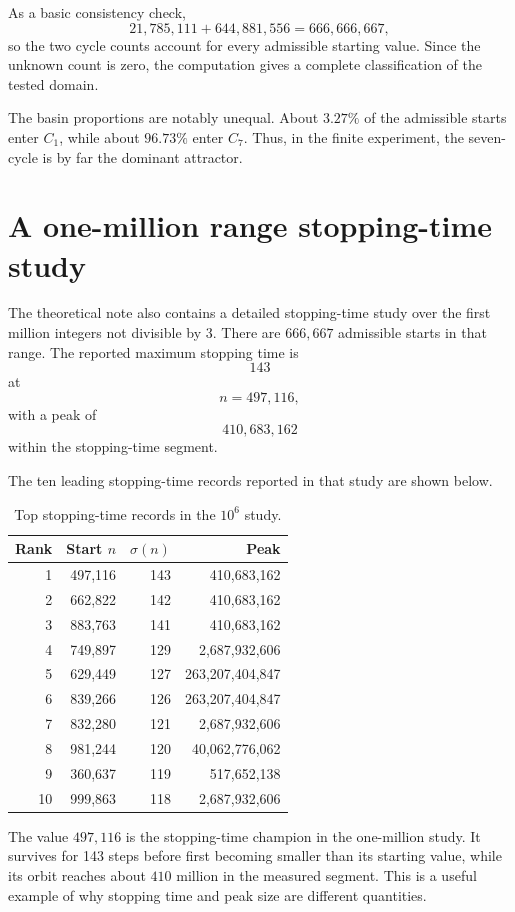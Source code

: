 \documentclass[11pt]{article}
\begin{document}
As a basic consistency check,
\[
21,785,111+644,881,556=666,666,667,
\]
so the two cycle counts account for every admissible starting value. Since the unknown count is zero, the computation gives a complete classification of the tested domain.

The basin proportions are notably unequal. About $3.27\%$ of the admissible starts enter $C_1$, while about $96.73\%$ enter $C_7$. Thus, in the finite experiment, the seven-cycle is by far the dominant attractor.

\section{A one-million range stopping-time study}
The theoretical note also contains a detailed stopping-time study over the first million integers not divisible by $3$. There are $666,667$ admissible starts in that range. The reported maximum stopping time is
\[
143
\]
at
\[
n=497,116,
\]
with a peak of
\[
410,683,162
\]
within the stopping-time segment.

The ten leading stopping-time records reported in that study are shown below.

\begin{table}[h]
\centering
\caption{Top stopping-time records in the $10^6$ study.}
\begin{tabular}{rrrr}
\toprule
Rank & Start $n$ & $\sigma(n)$ & Peak\\
\midrule
1 & 497,116 & 143 & 410,683,162\\
2 & 662,822 & 142 & 410,683,162\\
3 & 883,763 & 141 & 410,683,162\\
4 & 749,897 & 129 & 2,687,932,606\\
5 & 629,449 & 127 & 263,207,404,847\\
6 & 839,266 & 126 & 263,207,404,847\\
7 & 832,280 & 121 & 2,687,932,606\\
8 & 981,244 & 120 & 40,062,776,062\\
9 & 360,637 & 119 & 517,652,138\\
10 & 999,863 & 118 & 2,687,932,606\\
\bottomrule
\end{tabular}
\end{table}

The value $497,116$ is the stopping-time champion in the one-million study. It survives for 143 steps before first becoming smaller than its starting value, while its orbit reaches about $410$ million in the measured segment. This is a useful example of why stopping time and peak size are different quantities.
\end{document}

